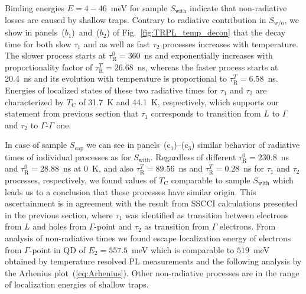 {{{\begin{table}
\begin{tabularx}{1\textwidth}{cCCCCCCC}
		\bottomrule
	\end{tabularx}\label{tab:TRPL_params}
\end{table}

Binding energies $E=4-46$~meV for sample $S_\mathrm{with}$ indicate that non-radiative losses are caused by shallow traps. Contrary to radiative contribution in $S_\mathrm{w/o}$, we show in panels~($b_1$)~and~($b_2$) of Fig.~\ref{fig:TRPL_temp_decon} that the decay time for both slow $\tau_1$ and as well as fast $\tau_2$ processes increases with temperature. The slower process starts at $\tau_\mathrm{R}^0=360$~ns and exponentially increases with proportionality factor of $\tau_\mathrm{R}^T=26.68$~ns, whereas the faster process starts at 20.4~ns and its evolution with temperature is proportional to $\tau_\mathrm{R}^T=6.58$~ns. Energies of localized states of these two radiative times for $\tau_1$ and $\tau_2$ are characterized by $T_\mathrm{C}$ of 31.7~K and 44.1~K, respectively, which supports our statement from previous section that $\tau_1$ corresponds to transition from $L$ to $\Gamma$ and $\tau_2$ to $\Gamma$-$\Gamma$ one.

In case of sample $S_\mathrm{cap}$ we can see in panels~(c$_1$)--(c$_3$) similar behavior of radiative times of individual processes as for $S_\mathrm{with}$. Regardless of different $\tau_\mathrm{R}^0=230.8$~ns and $\tau_\mathrm{R}^0=28.88$~ns at 0~K, and also $\tau_\mathrm{R}^T=89.56$~ns and $\tau_\mathrm{R}^T=0.28$~ns for $\tau_1$ and $\tau_2$ processes, respectively, we found values of $T_\mathrm{C}$ comparable to sample $S_\mathrm{with}$ which leads us to a conclusion that these processes have similar origin. This ascertainment is in agreement with the result from SSCCI calculations presented in the previous section, where $\tau_1$ was identified as transition between electrons from $L$ and holes from $\Gamma$-point and $\tau_2$ as transition from $\Gamma$ electrons. From analysis of non-radiative times we found escape localization energy of electrons from $\Gamma$-point in QD of $E_2=557.5$~meV which is comparable to $519$~meV obtained by temperature resolved PL measurements and the following analysis by the Arhenius plot~(\ref{eq:Arhenius}). Other non-radiative processes are in the range of localization energies of shallow traps.




}}}
